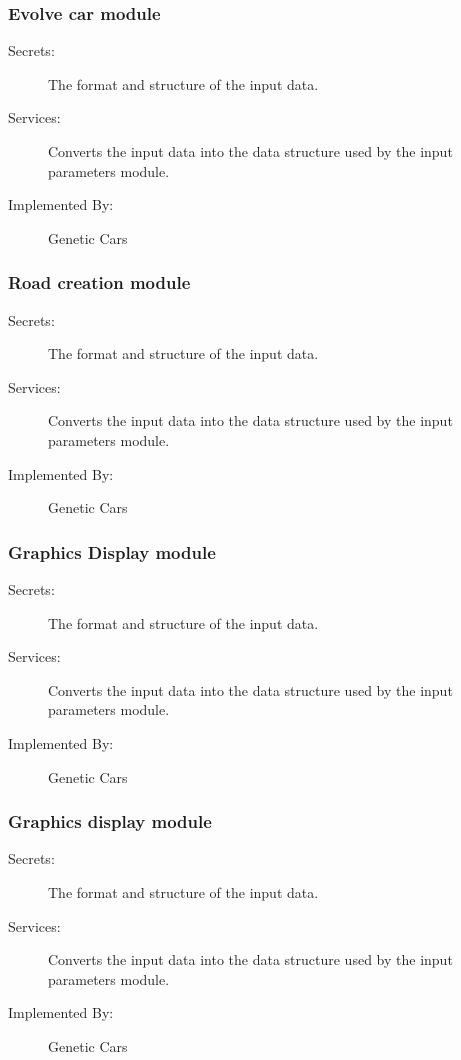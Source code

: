 \documentclass[12pt, titlepage]{article}
\begin{document}
\subsubsection{Evolve car module}

\begin{description}
\item[Secrets:]The format and structure of the input data.
\item[Services:]Converts the input data into the data structure used by the
  input parameters module.
\item[Implemented By:] Genetic Cars
\end{description}

\subsubsection{Road creation module}

\begin{description}
\item[Secrets:]The format and structure of the input data.
\item[Services:]Converts the input data into the data structure used by the
  input parameters module.
\item[Implemented By:] Genetic Cars
\end{description}

\subsubsection{Graphics Display module}

\begin{description}
\item[Secrets:]The format and structure of the input data.
\item[Services:]Converts the input data into the data structure used by the
  input parameters module.
\item[Implemented By:] Genetic Cars
\end{description}

\subsubsection{Graphics display module}

\begin{description}
\item[Secrets:]The format and structure of the input data.
\item[Services:]Converts the input data into the data structure used by the
  input parameters module.
\item[Implemented By:] Genetic Cars
\end{description}
\end{document}

